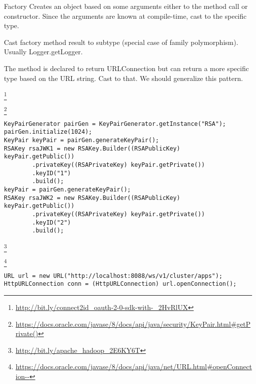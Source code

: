 \begin{pattern}{Factory}
Creates an object based on some arguments either to the method call or constructor.
Since the arguments are known at compile-time, cast to the specific type.

Cast factory method result to subtype (special case of family polymorphism).
Usually Logger.getLogger.

The method is declared to return URLConnection but can return a more specific type based on the URL string.
Cast to that.
We should generalize this pattern.
%

\instances{}
\footnote{\url{http://bit.ly/connect2id_oauth-2-0-sdk-with-_2HvRlUX}}

\footnote{\url{https://docs.oracle.com/javase/8/docs/api/java/security/KeyPair.html\#getPrivate()}}

\begin{verbatim}
KeyPairGenerator pairGen = KeyPairGenerator.getInstance("RSA");
pairGen.initialize(1024);
KeyPair keyPair = pairGen.generateKeyPair();
RSAKey rsaJWK1 = new RSAKey.Builder((RSAPublicKey) keyPair.getPublic())
        .privateKey((RSAPrivateKey) keyPair.getPrivate())
        .keyID("1")
        .build();
keyPair = pairGen.generateKeyPair();
RSAKey rsaJWK2 = new RSAKey.Builder((RSAPublicKey) keyPair.getPublic())
        .privateKey((RSAPrivateKey) keyPair.getPrivate())
        .keyID("2")
        .build();
\end{verbatim}

\footnote{\url{http://bit.ly/apache_hadoop_2E6KY6T}}

\footnote{\url{https://docs.oracle.com/javase/8/docs/api/java/net/URL.html\#openConnection--}}

\begin{verbatim}
URL url = new URL("http://localhost:8088/ws/v1/cluster/apps");
HttpURLConnection conn = (HttpURLConnection) url.openConnection();
\end{verbatim}


\end{pattern}
